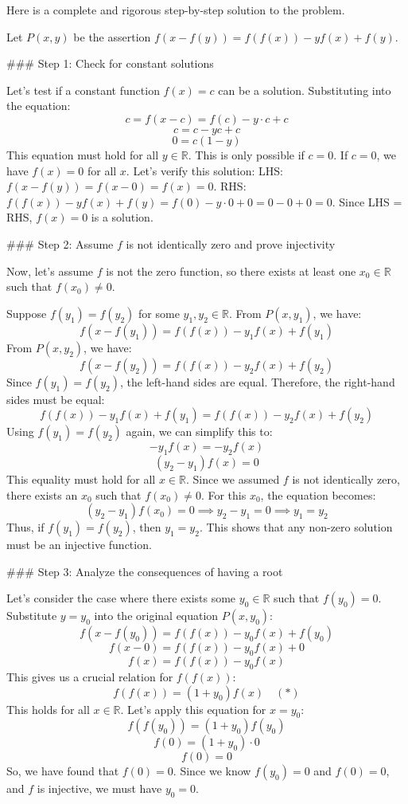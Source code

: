 Here is a complete and rigorous step-by-step solution to the problem.

Let $P(x,y)$ be the assertion $f(x-f(y)) = f(f(x)) - yf(x) + f(y)$.

### Step 1: Check for constant solutions

Let's test if a constant function $f(x) = c$ can be a solution.
Substituting into the equation:
$$c = f(x-c) = f(c) - y \cdot c + c$$
$$c = c - yc + c$$
$$0 = c(1-y)$$
This equation must hold for all $y \in \mathbb{R}$. This is only possible if $c=0$.
If $c=0$, we have $f(x) = 0$ for all $x$. Let's verify this solution:
LHS: $f(x-f(y)) = f(x-0) = f(x) = 0$.
RHS: $f(f(x)) - yf(x) + f(y) = f(0) - y \cdot 0 + 0 = 0 - 0 + 0 = 0$.
Since LHS = RHS, $f(x)=0$ is a solution.

### Step 2: Assume $f$ is not identically zero and prove injectivity

Now, let's assume $f$ is not the zero function, so there exists at least one $x_0 \in \mathbb{R}$ such that $f(x_0) \neq 0$.

Suppose $f(y_1) = f(y_2)$ for some $y_1, y_2 \in \mathbb{R}$.
From $P(x, y_1)$, we have:
$$f(x-f(y_1)) = f(f(x)) - y_1f(x) + f(y_1)$$
From $P(x, y_2)$, we have:
$$f(x-f(y_2)) = f(f(x)) - y_2f(x) + f(y_2)$$
Since $f(y_1) = f(y_2)$, the left-hand sides are equal. Therefore, the right-hand sides must be equal:
$$f(f(x)) - y_1f(x) + f(y_1) = f(f(x)) - y_2f(x) + f(y_2)$$
Using $f(y_1)=f(y_2)$ again, we can simplify this to:
$$-y_1f(x) = -y_2f(x)$$
$$(y_2-y_1)f(x) = 0$$
This equality must hold for all $x \in \mathbb{R}$. Since we assumed $f$ is not identically zero, there exists an $x_0$ such that $f(x_0) \neq 0$. For this $x_0$, the equation becomes:
$$(y_2-y_1)f(x_0) = 0 \implies y_2-y_1=0 \implies y_1=y_2$$
Thus, if $f(y_1)=f(y_2)$, then $y_1=y_2$. This shows that any non-zero solution must be an injective function.

### Step 3: Analyze the consequences of having a root

Let's consider the case where there exists some $y_0 \in \mathbb{R}$ such that $f(y_0)=0$.
Substitute $y=y_0$ into the original equation $P(x, y_0)$:
$$f(x-f(y_0)) = f(f(x)) - y_0f(x) + f(y_0)$$
$$f(x-0) = f(f(x)) - y_0f(x) + 0$$
$$f(x) = f(f(x)) - y_0f(x)$$
This gives us a crucial relation for $f(f(x))$:
$$f(f(x)) = (1+y_0)f(x) \quad (*)$$
This holds for all $x \in \mathbb{R}$.
Let's apply this equation for $x=y_0$:
$$f(f(y_0)) = (1+y_0)f(y_0)$$
$$f(0) = (1+y_0) \cdot 0$$
$$f(0) = 0$$
So, we have found that $f(0)=0$.
Since we know $f(y_0)=0$ and $f(0)=0$, and $f$ is injective, we must have $y_0=0$.


